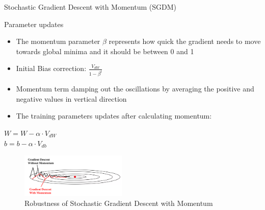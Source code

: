 \documentclass[10pt]{beamer}
\begin{document}
\begin{frame}{Stochastic Gradient Descent with Momentum (SGDM)}
    \begin{block}{Parameter updates}
         \begin{itemize}
             \item The momentum parameter $\beta$ represents how quick the gradient needs to move towards global minima and it should be between 0 and 1 
             \item Initial Bias correction: $\frac{V_{d W}}{1 - \beta^t}$
             \item Momentum term damping out the oscillations by averaging the positive and negative values in vertical direction 
             \item The training parameters updates after calculating momentum:  
         \end{itemize}
         \centering
         $W=W-\alpha \cdot V_{d W}$ \\
         $b=b-\alpha \cdot V_{d b}$  
         
        \begin{figure}
            \centering
            \includegraphics[width=0.45\textwidth]{Images/SGDM.png}
            \caption{Robustness of Stochastic Gradient Descent with Momentum}
        \end{figure}   
    \end{block}
\end{frame}
\end{document}
